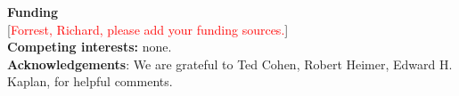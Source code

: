\documentclass[11pt]{article}
\newcommand{\comment}[1]{[\textcolor{red}{#1}]}
\begin{document}
\textbf{Funding} \\

\comment{Forrest, Richard, please add your funding sources.} \\


\textbf{Competing interests:} none. \\


\textbf{Acknowledgements}: We are grateful to
Ted Cohen, %
Robert Heimer, 
Edward H. Kaplan, 
for helpful comments. 





\end{document}
